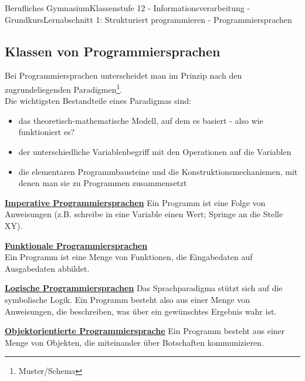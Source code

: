\documentclass[11pt,oneside,openany,headings=optiontotoc,11pt,numbers=noenddot]{article}
\begin{document}
\begin{worksheet}{Berufliches Gymnasium}{Klassenstufe 12 - Informationsverarbeitung - Grundkurs}{Lernabschnitt 1: Strukturiert programmieren - Programmiersprachen}
		\subsection{Klassen von Programmiersprachen}
		Bei Programmiersprachen unterscheidet man im Prinzip nach den zugrundeliegenden Paradigmen\footnote{Muster/Schema}.\\
		Die wichtigsten Bestandteile eines Paradigmas sind:
		\begin{itemize}
			\item das theoretisch-mathematische Modell, auf dem es basiert - also wie funktioniert es?
			\item der unterschiedliche Variablenbegriff mit den Operationen auf die Variablen
			\item die elementaren Programmbausteine und die Konstruktionsmechanismen, mit denen man sie zu Programmen zusammensetzt
		\end{itemize}
		\textbf{\underline{Imperative Programmiersprachen}}
		Ein Programm ist eine Folge von Anweisungen (z.B. schreibe in eine Variable einen Wert; Springe an die Stelle XY).\\
		\par\noindent
		\textbf{\underline{Funktionale Programmiersprachen}}\\
		Ein Programm ist eine Menge von Funktionen, die Eingabedaten auf Ausgabedaten abbildet.\\
		\par\noindent
		\textbf{\underline{Logische Programmiersprachen}}
		Das Sprachparadigma stützt sich auf die symbolische Logik. Ein Programm besteht also aus einer Menge von Anweisungen, die beschreiben, was über ein gewünschtes Ergebnis wahr ist.\\
		\par\noindent
		\textbf{\underline{Objektorientierte Programmiersprache}}
		Ein Programm besteht aus einer Menge von Objekten, die miteinander über Botschaften kommunizieren.
	\end{worksheet}
\end{document}
